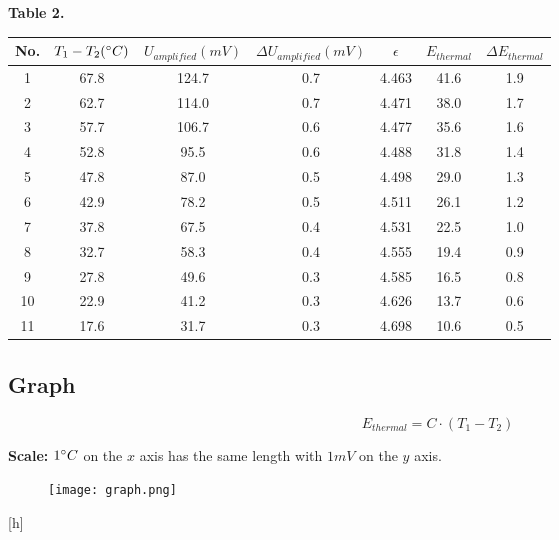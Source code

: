 \documentclass[12pt, a4paper]{article}
\newcommand{\Dt}{\Delta}
\newcommand{\hii}{\subsection}
\begin{document}
    \begin{center}
        \textbf{Table 2.} \\ \vspace{5mm}
        \begin{tabular}{|c|c|c|c|c|c|c|}
            \hline
                No. &
                $T_{1} - T_{2} (\degree C)$ &
                $U_{amplified} (mV)$ &
                $\Dt U_{amplified} (mV)$ &
                $\epsilon$ &
                $E_{thermal}$ &
                $\Dt E_{thermal}$ \\
            \hline
            1       & 67.8 & 124.7 & 0.7 & 4.463 & 41.6 & 1.9 \\
            \hline
            2       & 62.7 & 114.0 & 0.7 & 4.471 & 38.0 & 1.7 \\
            \hline
            3       & 57.7 & 106.7 & 0.6 & 4.477 & 35.6 & 1.6 \\
            \hline
            4       & 52.8 &  95.5 & 0.6 & 4.488 & 31.8 & 1.4 \\
            \hline
            5       & 47.8 &  87.0 & 0.5 & 4.498 & 29.0 & 1.3 \\
            \hline
            6       & 42.9 &  78.2 & 0.5 & 4.511 & 26.1 & 1.2 \\
            \hline
            7       & 37.8 &  67.5 & 0.4 & 4.531 & 22.5 & 1.0 \\
            \hline
            8       & 32.7 &  58.3 & 0.4 & 4.555 & 19.4 & 0.9 \\
            \hline
            9       & 27.8 &  49.6 & 0.3 & 4.585 & 16.5 & 0.8 \\
            \hline
            10      & 22.9 &  41.2 & 0.3 & 4.626 & 13.7 & 0.6 \\
            \hline
            11      & 17.6 &  31.7 & 0.3 & 4.698 & 10.6 & 0.5 \\
            \hline
        \end{tabular}
    \end{center}

    \pagebreak

    \hii{Graph}
    \begin{equation*}
        E_{thermal} = C \cdot (T_{1} - T_{2})
    \end{equation*}

    \par \textbf{Scale:} $1 \degree C$ on the $x$ axis has the same length with $1 mV$ on the $y$
    axis.

            \begin{figure}[h]
                \begin{center}
                    \texttt{[image: graph.png]}
                \end{center}
            \end{figure}[h]
\end{document}
